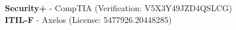 {\bf Security+} - CompTIA (Verification:  V5X3Y49JZD4QSLCG)\\
{\bf ITIL-F} - Axelos (License: 5477926.20448285)